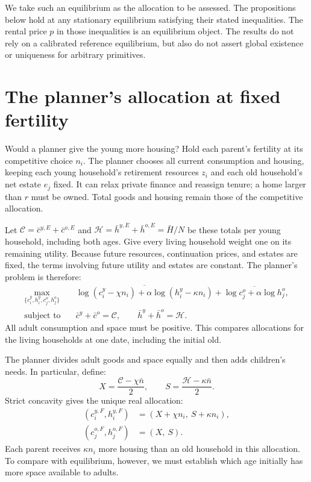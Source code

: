 \documentclass[11pt]{article}
\newcommand{\avg}[1]{\overline{#1}}
\begin{document}
We take such an equilibrium as the allocation to be assessed. The propositions
below hold at any stationary equilibrium satisfying their stated inequalities.
The rental price $p$ in those inequalities is an equilibrium object. The
results do not rely on a calibrated reference equilibrium, but also do not
assert global existence or uniqueness for arbitrary primitives.

\section{The planner's allocation at fixed fertility}

Would a planner give the young more housing? Hold each parent's fertility at
its competitive choice $n_i$. The planner chooses all current consumption and
housing, keeping each young household's retirement resources $z_i$ and each
old household's net estate $e_j$ fixed. It can relax private finance and
reassign tenure; a home larger than $r$ must be owned. Total goods and housing
remain those of the competitive allocation.

Let $\mathcal C=\bar c^{y,E}+\bar c^{o,E}$ and
$\mathcal H=\bar h^{y,E}+\bar h^{o,E}=\bar H/N$ be these totals per young
household, including both ages. Give every living household weight one on its
remaining utility. Because future resources, continuation prices, and estates
are fixed, the terms involving future utility and estates are constant.
The planner's problem is therefore:
\begin{equation}
\begin{split}
\max_{\{c_i^y,h_i^y,c_j^o,h_j^o\}}\quad
 &\avg{\log(c_i^y-\chi n_i)+\alpha\log(h_i^y-\kappa n_i)}
   +\avg{\log c_j^o+\alpha\log h_j^o},\\
\text{subject to}\quad
 &\bar c^y+\bar c^o=\mathcal C,\qquad
   \bar h^y+\bar h^o=\mathcal H.
\end{split}
\label{eq:dated_planner}
\end{equation}
All adult consumption and space must be positive. This compares allocations
for the living households at one date, including the initial old.

The planner divides adult goods and space equally and then adds children's
needs. In particular, define:
\begin{equation}
X=\frac{\mathcal C-\chi\bar n}{2},\qquad
S=\frac{\mathcal H-\kappa\bar n}{2}.
\label{eq:adult_allocation}
\end{equation}
Strict concavity gives the unique real allocation:
\begin{equation}
\boxed{\begin{aligned}
(c_i^{y,F},h_i^{y,F})&=(X+\chi n_i,\ S+\kappa n_i),\\
(c_j^{o,F},h_j^{o,F})&=(X,\ S).
\end{aligned}}
\label{eq:full_allocation}
\end{equation}
Each parent receives $\kappa n_i$ more housing than an old household in this
allocation. To compare with equilibrium, however, we must establish which
age initially has more space available to adults.
\end{document}
